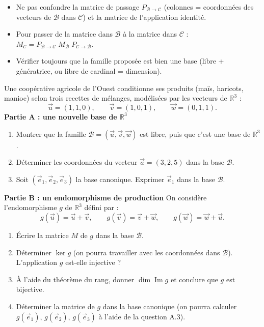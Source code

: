 \documentclass[11pt]{article}
\begin{document}
\begin{attention}
\begin{itemize}
\item Ne pas confondre la matrice de passage $P_{\mathcal{B} \to \mathcal{C}}$ (colonnes = coordonnées des vecteurs de $\mathcal{B}$ dans $\mathcal{C}$) et la matrice de l'application identité.
\item Pour passer de la matrice dans $\mathcal{B}$ à la matrice dans $\mathcal{C}$ : $M_{\mathcal{C}} = P_{\mathcal{B} \to \mathcal{C}} \; M_{\mathcal{B}} \; P_{\mathcal{C} \to \mathcal{B}}$.
\item Vérifier toujours que la famille proposée est bien une base (libre + génératrice, ou libre de cardinal = dimension).
\end{itemize}
\end{attention}

\begin{exercice}
Une coopérative agricole de l'Ouest conditionne ses produits (maïs, haricots, manioc) selon trois recettes de mélanges, modélisées par les vecteurs de $\mathbb{R}^3$ :
\[ \vec{u} = (1, 1, 0), \qquad \vec{v} = (1, 0, 1), \qquad \vec{w} = (0, 1, 1). \]
\textbf{Partie A : une nouvelle base de $\mathbb{R}^3$}
\begin{enumerate}
\item Montrer que la famille $\mathcal{B} = (\vec{u}, \vec{v}, \vec{w})$ est libre, puis que c'est une base de $\mathbb{R}^3$.
\item Déterminer les coordonnées du vecteur $\vec{a} = (3, 2, 5)$ dans la base $\mathcal{B}$.
\item Soit $(\vec{e}_1, \vec{e}_2, \vec{e}_3)$ la base canonique. Exprimer $\vec{e}_1$ dans la base $\mathcal{B}$.
\end{enumerate}
\textbf{Partie B : un endomorphisme de production}
On considère l'endomorphisme $g$ de $\mathbb{R}^3$ défini par :
\[ g(\vec{u}) = \vec{u} + \vec{v}, \qquad g(\vec{v}) = \vec{v} + \vec{w}, \qquad g(\vec{w}) = \vec{w} + \vec{u}. \]
\begin{enumerate}
\item Écrire la matrice $M$ de $g$ dans la base $\mathcal{B}$.
\item Déterminer $\ker g$ (on pourra travailler avec les coordonnées dans $\mathcal{B}$). L'application $g$ est-elle injective ?
\item À l'aide du théorème du rang, donner $\dim \operatorname{Im} g$ et conclure que $g$ est bijective.
\item Déterminer la matrice de $g$ dans la base canonique (on pourra calculer $g(\vec{e}_1)$, $g(\vec{e}_2)$, $g(\vec{e}_3)$ à l'aide de la question A.3).
\end{enumerate}
\end{exercice}
\end{document}
